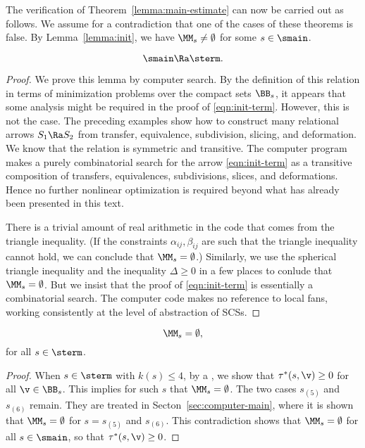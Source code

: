 \begin{remark}
The verification of 
Theorem~\ref{lemma:main-estimate}  can now be
carried out as follows.  We assume for a contradiction that
one of the cases of these theorems is false.  By Lemma~\ref{lemma:init}, we have
$\MM_s\ne\emptyset$ for some $s\in \smain$.  
\end{remark}

\begin{lemma}
\begin{equation}\label{eqn:init-term}
\smain\Ra \sterm.
\end{equation}
\end{lemma}

\begin{proof}
We prove this lemma by computer search.
   By the definition of this
relation in terms of minimization problems over the compact sets
$\BB_s$,
it appears that some analysis might be required in the proof
of \eqref{eqn:init-term}.  However, this is not the case.  The
preceding
examples show how to construct many relational arrows $S_1\Ra S_2$
from transfer, equivalence, subdivision, slicing, and deformation.
We know that the relation is symmetric and transitive.   The computer
program makes a purely combinatorial search for the arrow
\eqref{eqn:init-term}
as a transitive composition of transfers, equivalences, subdivisions, slices,
and
deformations.  Hence no further nonlinear optimization is required
beyond
what has already been presented in this text.

There is a trivial amount of real arithmetic in the code that comes
from the triangle inequality.   (If
the constraints $\alpha_{ij},\beta_{ij}$ are such that the triangle
inequality cannot hold, we can conclude that $\MM_s=\emptyset$.)
Similarly, we use the spherical triangle inequality and the inequality
$\Delta\ge0$ in a few places to conlude that $\MM_s=\emptyset$.
But we insist that the proof of \eqref{eqn:init-term} is essentially
a combinatorial search.  The computer code makes no reference
to local fans, working consistently at the level of abstraction of SCSs.
\end{proof}

\begin{lemma}\label{lemma:sterm-empty}
\[
\MM_s=\emptyset,
\]
for all $s\in\sterm$.
\end{lemma}

\begin{proof}
When $s\in \sterm$
with $k(s)\le 4$, by a , we show
that $\tau^*(s,\v) \ge0$ for all $\v\in \BB_s$.  This implies for such $s$
that $\MM_s=\emptyset$.  The two cases $s_{(5)}$ and $s_{(6)}$ remain.
They are treated in Secton~\ref{sec:computer-main}, where it is shown
that $\MM_s=\emptyset$ for $ s=s_{(5)}$ and $s_{(6)}$.  This
contradiction shows that $\MM_s=\emptyset$ for all $s\in \smain$,
so that $\tau^*(s,\v)\ge0$. 
\end{proof}


